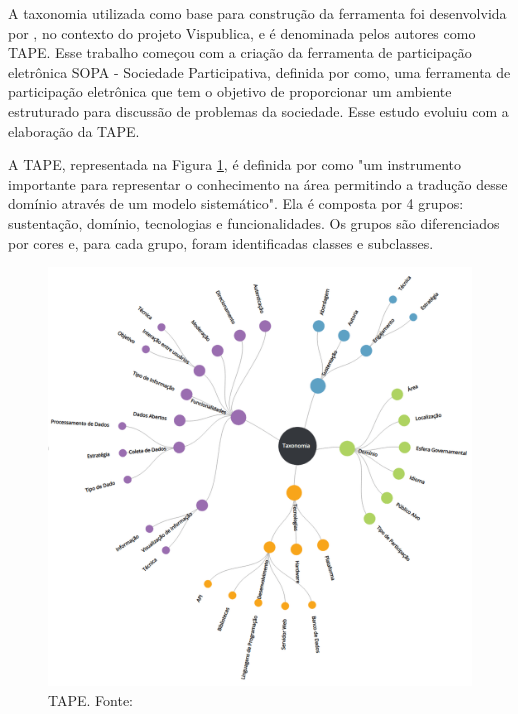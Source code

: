 \par
A taxonomia utilizada como base para construção da ferramenta foi desenvolvida por , no contexto do projeto Vispublica, e é denominada pelos autores como TAPE. 
Esse trabalho começou com a criação da ferramenta de participação eletrônica SOPA - Sociedade Participativa, definida por  como, uma ferramenta
de participação eletrônica que tem o objetivo de proporcionar um ambiente estruturado para discussão de problemas da sociedade.
Esse estudo evoluiu com a elaboração da TAPE. 

\par
A TAPE, representada na Figura \ref{fig:taxonomia-vispublica}, é definida por  como "um instrumento importante para representar o conhecimento na área 
permitindo a tradução desse domínio através de um modelo sistemático". Ela é composta por 4 grupos: sustentação, domínio, tecnologias e funcionalidades.
Os grupos são diferenciados por cores e, para cada grupo, foram identificadas classes e subclasses.

\begin{figure}[!ht]
    \centering
    \includegraphics[scale=0.30]{./figuras/taxonopart-radial.png}
    \caption{TAPE. Fonte: }
    \label{fig:taxonomia-vispublica}
\end{figure}

